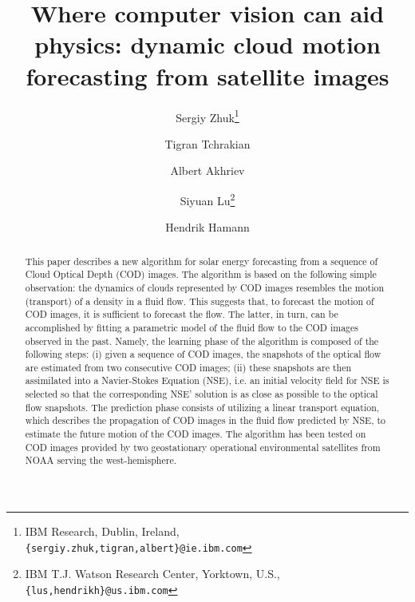 \documentclass[onecolumn, 12pt, conference]{ieeeconf}
\title{Where computer vision can aid physics: dynamic cloud motion forecasting from satellite images}
\author{Sergiy Zhuk\thanks{IBM Research, Dublin, Ireland, \texttt{\{sergiy.zhuk,tigran,albert\}@ie.ibm.com}} \and Tigran Tchrakian \and Albert Akhriev \and Siyuan Lu\thanks{IBM T.J. Watson Research Center, Yorktown, U.S., \texttt{\{lus,hendrikh\}@us.ibm.com}} \and Hendrik Hamann}
\begin{document}
\maketitle
\begin{abstract}
This paper describes a new algorithm for solar energy forecasting from a sequence of Cloud Optical Depth (COD) images. The algorithm is based on the following simple observation: the dynamics of clouds represented by COD images resembles the motion (transport) of a density in a fluid flow. This suggests that, to forecast the motion of COD images, it is sufficient to forecast the flow. The latter, in turn, can be accomplished by fitting a parametric model of the fluid flow to the COD images observed in the past. Namely, the learning phase of the algorithm is composed of the following steps: (i) given a sequence of COD images, the snapshots of the optical flow are estimated from two consecutive COD images; (ii) these snapshots are then assimilated into a Navier-Stokes Equation (NSE), i.e. an initial velocity field for NSE is selected so that the corresponding NSE' solution is as close as possible to the optical flow snapshots. The prediction phase consists of utilizing a linear transport equation, which describes the propagation of COD images in the fluid flow predicted by NSE, to estimate the future motion of the COD images. The algorithm has been tested on COD images provided by two geostationary operational environmental satellites from NOAA serving the west-hemisphere.
\end{abstract}
\end{document}
